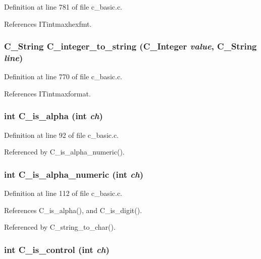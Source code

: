 Definition at line 781 of file c\_\-basic.c.

References ITintmaxhexfmt.
\subsubsection{\setlength{\rightskip}{0pt plus 5cm}\bf{C\_\-String} C\_\-integer\_\-to\_\-string (\bf{C\_\-Integer} {\em value}, \bf{C\_\-String} {\em line})}\label{c__basic_8c_8bb8098660f720014870c6a10abeaf62}




Definition at line 770 of file c\_\-basic.c.

References ITintmaxformat.
\subsubsection{\setlength{\rightskip}{0pt plus 5cm}int C\_\-is\_\-alpha (int {\em ch})}\label{c__basic_8c_b41e507db5ccf2e1e2550123f8029ddb}




Definition at line 92 of file c\_\-basic.c.

Referenced by C\_\-is\_\-alpha\_\-numeric().
\subsubsection{\setlength{\rightskip}{0pt plus 5cm}int C\_\-is\_\-alpha\_\-numeric (int {\em ch})}\label{c__basic_8c_47689baf335fe031f10020c177d153aa}




Definition at line 112 of file c\_\-basic.c.

References C\_\-is\_\-alpha(), and C\_\-is\_\-digit().

Referenced by C\_\-string\_\-to\_\-char().
\subsubsection{\setlength{\rightskip}{0pt plus 5cm}int C\_\-is\_\-control (int {\em ch})}\label{c__basic_8c_146455b3b5e15731b71a83ffc5f24c15}




